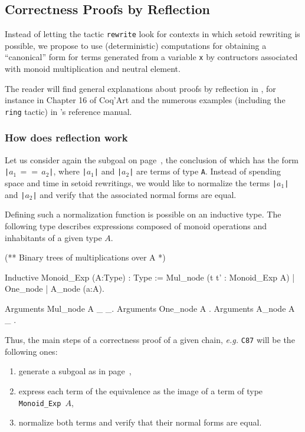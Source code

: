 \subsection{Correctness Proofs by Reflection}
\label{reflection-section}
Instead of letting the tactic \texttt{rewrite} look for contexts in which
setoid rewriting is possible, we propose to use (deterministic) computations for
obtaining a ``canonical'' form for terms generated from a variable \texttt{x}
by contructors associated with monoid multiplication and neutral element.

The reader will find general explanations about proofs by reflection in \coq{},
for instance in Chapter 16 of Coq'Art\cite{BC04} and the numerous examples (including the \texttt{ring} tactic) 
in \coq's reference manual.


\subsubsection{How does reflection work}
Let us consider again the subgoal on page~\pageref{fig:big-goal}, the conclusion of which has the form \texttt{|$a_1\,==\,a_2$|}, where \texttt{|$a_1$|} and
\texttt{|$a_2$|} are terms of  type \texttt{A}.
Instead of spending space and time in setoid rewritings, we would like to
normalize the terms \texttt{|$a_1$|} and \texttt{|$a_2$|} and verify that 
the associated normal forms are equal.

Defining such a normalization function is possible on an inductive type.
The following type describes expressions composed of monoid operations and inhabitants of a given type $A$.

\begin{Coqsrc}
(** Binary trees of multiplications over A *)

Inductive Monoid_Exp (A:Type) : Type :=
 Mul_node (t t' : Monoid_Exp A) | One_node | A_node (a:A).

Arguments Mul_node {A} _ _.
Arguments One_node {A} .
Arguments A_node {A} _ .
\end{Coqsrc}




Thus, the main steps of a correctness proof of a given chain, \emph{e.g.}
\texttt{C87} will be the following ones:
\begin{enumerate}
\item generate a subgoal as in page~\pageref{fig:big-goal},
\item express each term of the equivalence as the image of a term
     of type \texttt{Monoid\_Exp $A$},
\item normalize both terms and verify that their normal forms are equal.
\end{enumerate}

